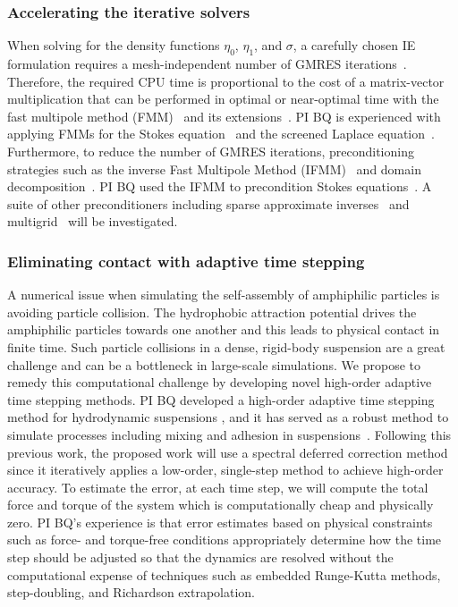 \subsubsection{Accelerating the iterative solvers}
\label{subsec:NumericalIssues}

When solving for the density functions $\eta_0$, $\eta_1$, and $\sigma$,
a carefully chosen IE formulation requires a mesh-independent number of
GMRES iterations~\cite{cam-ips-kel-mey-xue1996}. Therefore, the required
CPU time is proportional to the cost of a matrix-vector multiplication
that can be performed in optimal or near-optimal time with the fast
multipole method (FMM)~\cite{fmm5} and its extensions~\cite{fmm1, fmm2,
fmm3, fmm4, fmm6, fmm7, fmm8}. PI BQ is experienced with applying FMMs
for the Stokes equation~\cite{qua-bir2014, bys-sha-qua2020} and the
screened Laplace equation~\cite{kro-qua2011, qua2011}. Furthermore, to
reduce the number of GMRES iterations, preconditioning strategies such
as the inverse Fast Multipole Method (IFMM)~\cite{cou-pou-dar2017} and
domain decomposition~\cite{che-bir2021}. PI BQ used the IFMM to
precondition Stokes equations~\cite{qua-cou-dar2018}. A suite of other
preconditioners including sparse approximate inverses~\cite{che2000} and
multigrid~\cite{hem-sch1981, sch1982} will be investigated.


\subsubsection{Eliminating contact with adaptive time stepping}
\label{subsec:timeStepping}

A numerical issue when simulating the self-assembly of amphiphilic
particles is avoiding particle collision. The hydrophobic attraction
potential drives the amphiphilic particles towards one another and this
leads to physical contact in finite time. Such particle collisions in a
dense, rigid-body suspension are a great challenge and can be a
bottleneck in large-scale simulations. We propose to remedy this
computational challenge by developing novel high-order adaptive time
stepping methods. PI BQ developed a high-order adaptive time
stepping method for hydrodynamic suspensions \cite{qua-bir2016}, and it
has served as a robust method to simulate processes including mixing and
adhesion in suspensions~\cite{qua-vee-you2019, kab-qua-bir2017}.
Following this previous work, the proposed work will use a spectral
deferred correction method~\cite{dut-gre-rok2000} since it iteratively
applies a low-order, single-step method to achieve high-order accuracy.
To estimate the error, at each time step, we will compute the total
force and torque of the system which is computationally cheap and
physically zero. PI BQ's experience is that error estimates based on
physical constraints such as force- and torque-free conditions
appropriately determine how the time step should be adjusted so that the
dynamics are resolved without the computational expense of techniques
such as embedded Runge-Kutta methods, step-doubling, and Richardson
extrapolation.


